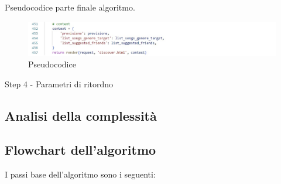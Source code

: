 \newpage
Pseudocodice parte finale algoritmo. 
\begin{figure}[H]
    \centering
    \includegraphics[scale=0.7]{images/alg4.jpg}
    \caption{Pseudocodice}
    \label{fig-pseudocodice-4}
\end{figure}
\vspace{0.5cm}

\begin{algorithm}[H]

    \caption{Step 4 - Parametri di ritordno}
    \SetAlgoLined
   
\end{algorithm}




\newpage


\subsection{Analisi della complessità}


\newpage
\subsection{Flowchart dell'algoritmo}
I passi base dell'algoritmo sono i seguenti: 